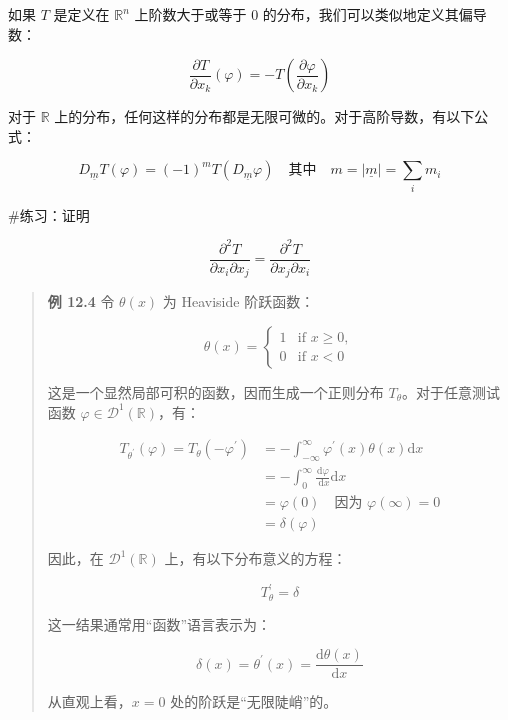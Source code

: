 如果 \(T\) 是定义在 \(\mathbb{R}^n\) 上阶数大于或等于 0
的分布，我们可以类似地定义其偏导数：

\[
\frac{\partial T}{\partial x_k}(\varphi) = -T\left(\frac{\partial \varphi}{\partial x_k}\right)
\]

对于 \(\mathbb{R}\)
上的分布，任何这样的分布都是无限可微的。对于高阶导数，有以下公式：

\[
D_{\underline{m}} T(\varphi) = (-1)^m T\left(D_{\underline{m}} \varphi\right) \quad \text{其中} \quad m = |\underline{m}| = \sum_{i} m_i
\]

\#练习：证明

\[
\frac{\partial^2 T}{\partial x_i \partial x_j} = \frac{\partial^2 T}{\partial x_j \partial x_i}
\]

\begin{quote}
\textbf{例 12.4} 令 \(\theta(x)\) 为 Heaviside 阶跃函数：

\[
\theta(x) = 
\begin{cases} 
1 & \text{if } x \geq 0, \\ 
0 & \text{if } x < 0 
\end{cases}
\]

这是一个显然局部可积的函数，因而生成一个正则分布
\(T_\theta\)。对于任意测试函数
\(\varphi \in \mathcal{D}^1(\mathbb{R})\)，有：

\[
\begin{aligned}
T_{\theta^{\prime}}(\varphi) = T_\theta\left(-\varphi^{\prime}\right) & = -\int_{-\infty}^\infty \varphi^{\prime}(x) \theta(x) \mathrm{d}x \\
& = -\int_0^\infty \frac{\mathrm{d}\varphi}{\mathrm{~d}x} \mathrm{d}x \\
& = \varphi(0) \quad \text{因为 } \varphi(\infty) = 0 \\
& = \delta(\varphi)
\end{aligned}
\]

因此，在 \(\mathcal{D}^1(\mathbb{R})\) 上，有以下分布意义的方程：

\[
T_\theta^{\prime} = \delta
\]

这一结果通常用``函数''语言表示为：

\[
\delta(x) = \theta^{\prime}(x) = \frac{\mathrm{d}\theta(x)}{\mathrm{d}x}
\]

从直观上看，\(x=0\) 处的阶跃是``无限陡峭''的。
\end{quote}

